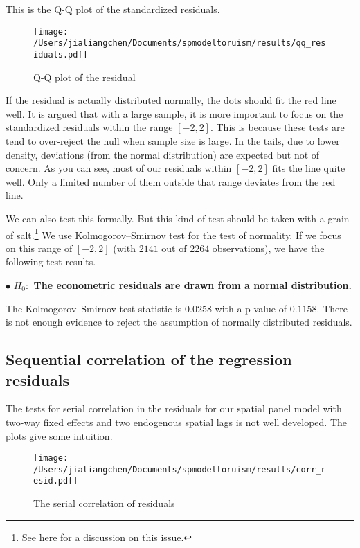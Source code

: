 \documentclass[11pt,a4paper]{amsart}
\theoremstyle{plain}
\theoremstyle{definition}
\begin{document}
This is the Q-Q plot of the standardized residuals.
\begin{figure}[hbt]
	{\centering \texttt{[image: /Users/jialiangchen/Documents/spmodeltoruism/results/qq\_residuals.pdf]}}
	\caption{Q-Q plot of the residual}\label{F:qq_residuals}
\end{figure}

If the residual is actually distributed normally, the dots should fit the red line well. It is argued that with a large sample, it is more important to focus on the standardized residuals within the range $[-2, 2]$. This is because these tests are tend to over-reject the null when  sample size is large.  In the tails, due to lower density, deviations (from the normal distribution) are expected but not of concern. As you can see, most of our residuals within $[-2, 2]$ fits the line quite well. Only a limited number of them outside that range deviates from the red line.

We can also test this formally. But this kind of test should be taken with a grain of salt.\footnote{See \href{https://stats.stackexchange.com/questions/2492/is-normality-testing-essentially-useless}{here} for a discussion on this issue.} We use Kolmogorov–Smirnov test for the test of normality. If we focus on this range of $[-2, 2]$ (with $2141$ out of $2264$ observations), we have the following test results.

$\bullet$ \textbf{$H_{0}:$ The econometric residuals are drawn from a normal distribution.} 

The Kolmogorov–Smirnov test statistic is  $0.0258$ with a p-value of $0.1158$. There is not enough evidence to reject the assumption of normally distributed residuals. 

\subsection{Sequential correlation of the regression residuals}\hfill\par

The tests for serial correlation in the residuals for our spatial panel model with two-way fixed effects and two endogenous spatial lags is not well developed. The plots give some intuition.

\begin{figure}[hbt]
	{\centering \texttt{[image: /Users/jialiangchen/Documents/spmodeltoruism/results/corr\_resid.pdf]}}
	\caption{The serial correlation of residuals}\label{F:corr_resid}
\end{figure}
\end{document}
